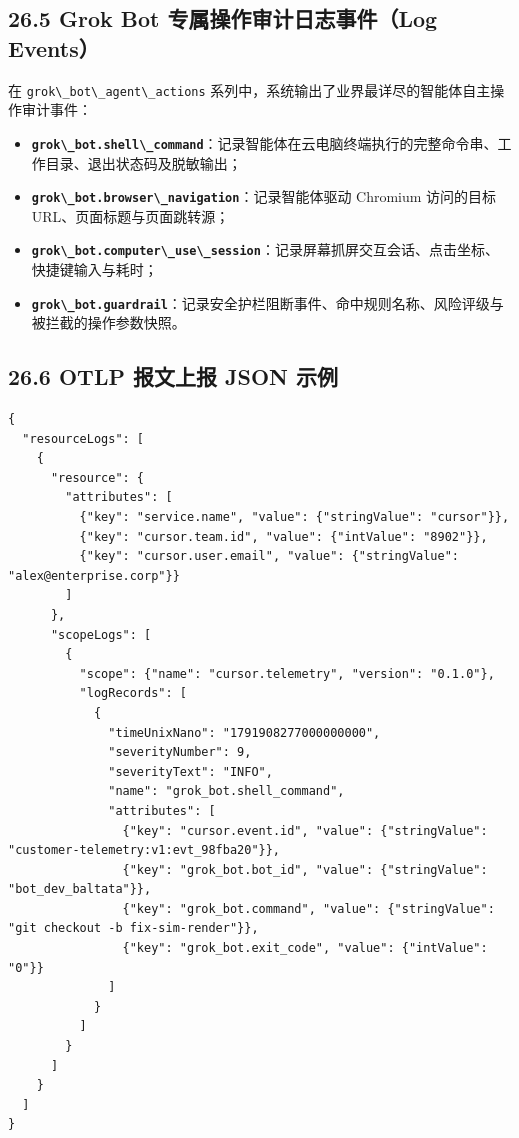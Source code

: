 \documentclass[10.5pt,a4paper,oneside]{report}
\providecommand{\tightlist}{\setlength{\itemsep}{0pt}\setlength{\parskip}{0pt}}
\newcommand{\passthrough}[1]{#1}
\begin{document}
\subsection{26.5 Grok Bot 专属操作审计日志事件（Log
Events）}\label{grok-bot-ux4e13ux5c5eux64cdux4f5cux5ba1ux8ba1ux65e5ux5fd7ux4e8bux4ef6log-events}

在 \passthrough{\lstinline!grok\_bot\_agent\_actions!}
系列中，系统输出了业界最详尽的智能体自主操作审计事件：

\begin{itemize}
\tightlist
\item
  \textbf{\passthrough{\lstinline!grok\_bot.shell\_command!}}：记录智能体在云电脑终端执行的完整命令串、工作目录、退出状态码及脱敏输出；
\item
  \textbf{\passthrough{\lstinline!grok\_bot.browser\_navigation!}}：记录智能体驱动
  Chromium 访问的目标 URL、页面标题与页面跳转源；
\item
  \textbf{\passthrough{\lstinline!grok\_bot.computer\_use\_session!}}：记录屏幕抓屏交互会话、点击坐标、快捷键输入与耗时；
\item
  \textbf{\passthrough{\lstinline!grok\_bot.guardrail!}}：记录安全护栏阻断事件、命中规则名称、风险评级与被拦截的操作参数快照。
\end{itemize}

\subsection{26.6 OTLP 报文上报 JSON
示例}\label{otlp-ux62a5ux6587ux4e0aux62a5-json-ux793aux4f8b}

\begin{lstlisting}
{
  "resourceLogs": [
    {
      "resource": {
        "attributes": [
          {"key": "service.name", "value": {"stringValue": "cursor"}},
          {"key": "cursor.team.id", "value": {"intValue": "8902"}},
          {"key": "cursor.user.email", "value": {"stringValue": "alex@enterprise.corp"}}
        ]
      },
      "scopeLogs": [
        {
          "scope": {"name": "cursor.telemetry", "version": "0.1.0"},
          "logRecords": [
            {
              "timeUnixNano": "1791908277000000000",
              "severityNumber": 9,
              "severityText": "INFO",
              "name": "grok_bot.shell_command",
              "attributes": [
                {"key": "cursor.event.id", "value": {"stringValue": "customer-telemetry:v1:evt_98fba20"}},
                {"key": "grok_bot.bot_id", "value": {"stringValue": "bot_dev_baltata"}},
                {"key": "grok_bot.command", "value": {"stringValue": "git checkout -b fix-sim-render"}},
                {"key": "grok_bot.exit_code", "value": {"intValue": "0"}}
              ]
            }
          ]
        }
      ]
    }
  ]
}
\end{lstlisting}
\end{document}
